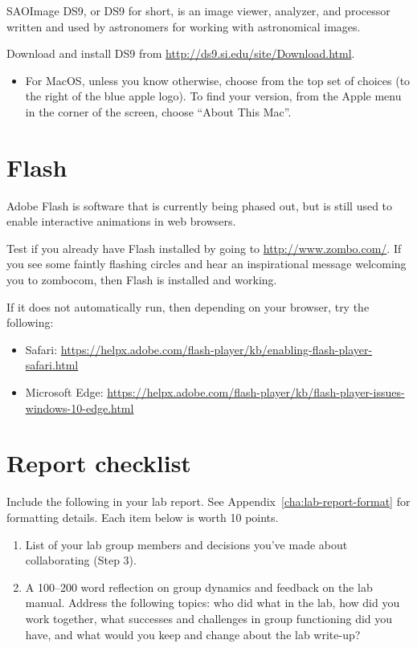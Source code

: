 SAOImage DS9, or DS9 for short, is an image viewer, analyzer, and processor written and used by astronomers for working with astronomical images.

\begin{steps}
	\item Download and install DS9 from \url{http://ds9.si.edu/site/Download.html}.
	\begin{itemize}
		\item For MacOS, unless you know otherwise, choose from the top set of choices (to the right of the blue apple logo). To find your version, from the Apple menu in the corner of the screen, choose ``About This Mac''.
	\end{itemize}
\end{steps}

\section{Flash}

Adobe Flash is software that is currently being phased out, but is still used to enable interactive animations in web browsers.

\begin{steps}
	\item Test if you already have Flash installed by going to \url{http://www.zombo.com/}. If you see some faintly flashing circles and hear an inspirational message welcoming you to zombocom, then Flash is installed and working.
	
	If it does not automatically run, then depending on your browser, try the following:
	\begin{itemize}
		\item Safari: \url{https://helpx.adobe.com/flash-player/kb/enabling-flash-player-safari.html}
		
		\item Microsoft Edge: \url{https://helpx.adobe.com/flash-player/kb/flash-player-issues-windows-10-edge.html}
	\end{itemize}
	
\end{steps}

\section{Report checklist}

Include the following in your lab report. See Appendix~\ref{cha:lab-report-format} for formatting details. Each item below is worth 10 points.

\begin{enumerate}
	\item List of your lab group members and decisions you've made about collaborating (Step 3).
	
	\item A 100--200 word reflection on group dynamics and feedback on the lab manual. Address the following topics: who did what in the lab, how did you work together, what successes and challenges in group functioning did you have, and what would you keep and change about the lab write-up?
\end{enumerate}